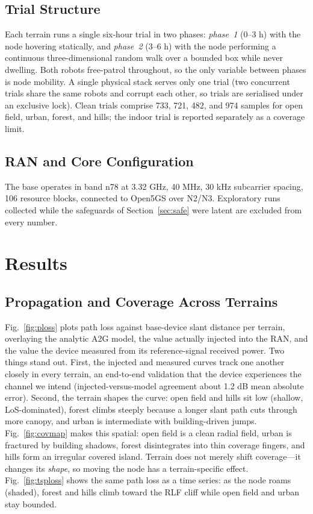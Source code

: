 \documentclass[conference]{IEEEtran}
\begin{document}
\subsection{Trial Structure}
Each terrain runs a single six-hour trial in two phases: \emph{phase~1} (0--3 h) with
the node hovering statically, and \emph{phase~2} (3--6 h) with the node performing a
continuous three-dimensional random walk over a bounded box while never dwelling. Both
robots free-patrol throughout, so the only variable between phases is node mobility. A
single physical stack serves only one trial (two concurrent trials share the same
robots and corrupt each other, so trials are serialised under an exclusive lock).
Clean trials comprise 733, 721, 482, and 974 samples for open field, urban, forest,
and hills; the indoor trial is reported separately as a coverage limit.

\subsection{RAN and Core Configuration}
The base operates in band n78 at 3.32 GHz, 40 MHz, 30 kHz subcarrier spacing, 106
resource blocks, connected to Open5GS over N2/N3. Exploratory runs collected while the
safeguards of Section~\ref{sec:safe} were latent are excluded from every number.

\section{Results}
\label{sec:results}

\subsection{Propagation and Coverage Across Terrains}
Fig.~\ref{fig:ploss} plots path loss against base-device slant distance per terrain,
overlaying the analytic A2G model, the value actually injected into the RAN, and the
value the device measured from its reference-signal received power. Two things stand
out. First, the injected and measured curves track one another closely in every
terrain, an end-to-end validation that the device experiences the channel we intend
(injected-versus-model agreement about 1.2 dB mean absolute error). Second,
the terrain shapes the curve: open field and hills sit low (shallow, LoS-dominated),
forest climbs steeply because a longer slant path cuts through more canopy, and urban
is intermediate with building-driven jumps. Fig.~\ref{fig:covmap} makes this spatial:
open field is a clean radial field, urban is fractured by building shadows, forest
disintegrates into thin coverage fingers, and hills form an irregular covered island.
Terrain does not merely shift coverage---it changes its \emph{shape}, so moving the
node has a terrain-specific effect. Fig.~\ref{fig:tsploss} shows the same path loss as
a time series: as the node roams (shaded), forest and hills climb toward the RLF cliff
while open field and urban stay bounded.
\end{document}
